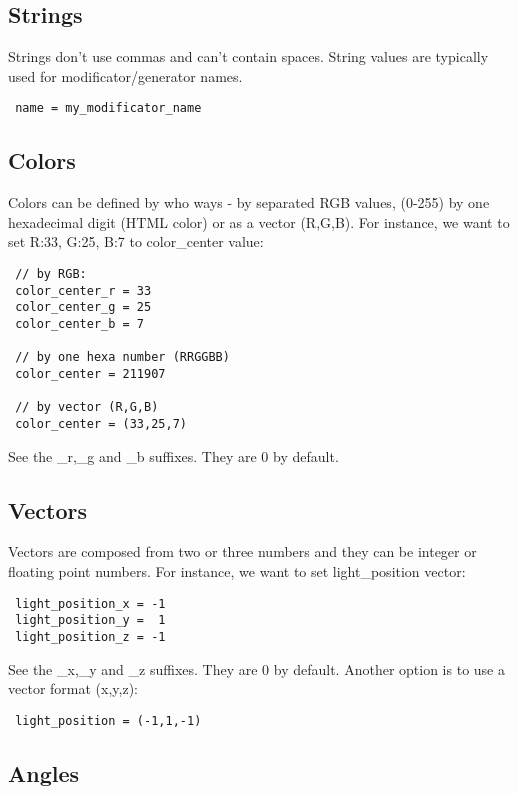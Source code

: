 \documentclass[9pt]{article}
\begin{document}
\subsection{Strings}

Strings don't use commas and can't contain spaces. String values are typically 
used for modificator/generator names.

\begin{verbatim}
 name = my_modificator_name
\end{verbatim}

\subsection{Colors}

Colors can be defined by who ways - by separated RGB values,
(0-255) by one hexadecimal digit (HTML color) or as a vector (R,G,B). 
For instance, we want to set R:33, G:25, B:7 to color\_center value:

\begin{verbatim}
 // by RGB:
 color_center_r = 33
 color_center_g = 25
 color_center_b = 7
 
 // by one hexa number (RRGGBB)
 color_center = 211907
 
 // by vector (R,G,B)
 color_center = (33,25,7) 
\end{verbatim}

See the \_r,\_g and \_b suffixes. They are 0 by default.

\subsection{Vectors}

Vectors are composed from two or three numbers and they
can be integer or floating point numbers. For instance, we want to 
set light\_position vector:

\begin{verbatim}
 light_position_x = -1
 light_position_y =  1
 light_position_z = -1
\end{verbatim}

See the \_x,\_y and \_z suffixes. They are 0 by default. Another option is
to use a vector format (x,y,z):

\begin{verbatim}
 light_position = (-1,1,-1)
\end{verbatim}

\subsection{Angles}
\end{document}
